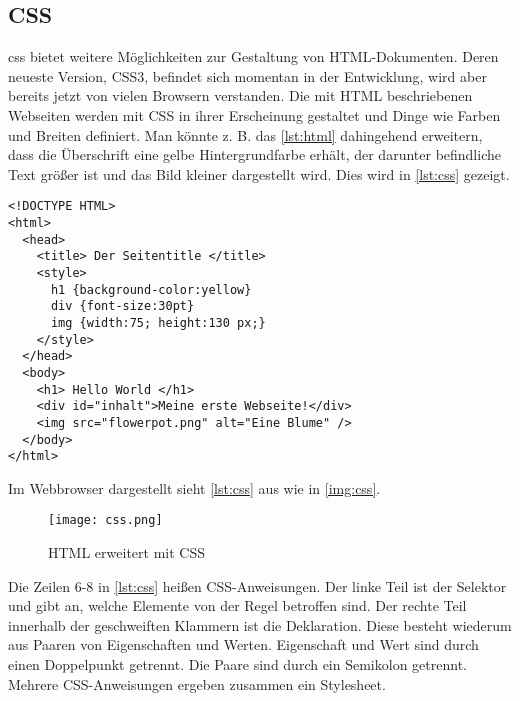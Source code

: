 \subsection{CSS}
\ac{css} bietet weitere Möglichkeiten zur Gestaltung von HTML-Dokumenten. Deren neueste Version, CSS3, befindet sich momentan in der Entwicklung, wird aber bereits jetzt von vielen Browsern verstanden. Die mit HTML beschriebenen Webseiten werden mit CSS in ihrer Erscheinung gestaltet und Dinge wie Farben und Breiten definiert. Man könnte z. B. das \autoref{lst:html} dahingehend erweitern, dass die Überschrift eine gelbe Hintergrundfarbe erhält, der darunter befindliche Text größer ist und das Bild kleiner dargestellt wird. Dies wird in \autoref{lst:css} gezeigt.

\begin{lstlisting}[style=htmlcssjs, caption=Beispiel CSS, label=lst:css]
<!DOCTYPE HTML>
<html>
  <head>
    <title> Der Seitentitle </title>
    <style>
      h1 {background-color:yellow}
      div {font-size:30pt}
      img {width:75; height:130 px;}
    </style>
  </head>
  <body>
    <h1> Hello World </h1>
    <div id="inhalt">Meine erste Webseite!</div>
    <img src="flowerpot.png" alt="Eine Blume" />
  </body>
</html>
\end{lstlisting}

Im Webbrowser dargestellt sieht \autoref{lst:css} aus wie in \autoref{img:css}.

\begin{figure}[H]
	\begin{center}
		\texttt{[image: css.png]}
		\caption{HTML erweitert mit CSS}
		\label{img:css}
	\end{center}
\end{figure}

Die Zeilen 6-8 in \autoref{lst:css} heißen CSS-Anweisungen. Der linke Teil ist der Selektor und gibt an, welche Elemente von der Regel betroffen sind. Der rechte Teil innerhalb der geschweiften Klammern ist die Deklaration. Diese besteht wiederum aus Paaren von Eigenschaften und Werten. Eigenschaft und Wert sind durch einen Doppelpunkt getrennt. Die Paare sind durch ein Semikolon getrennt. Mehrere CSS-Anweisungen ergeben zusammen ein Stylesheet.